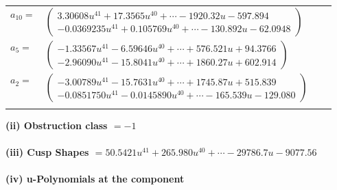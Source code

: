 \documentclass[1p]{elsarticle_modified}
\theoremstyle{definition}
\begin{document}
\begin{tabular}{m{7pt} m{180pt} m{7pt} m{180pt} }
\flushright $a_{10}=$&$\begin{pmatrix}3.30608 u^{41}+17.3565 u^{40}+\cdots-1920.32 u-597.894\\-0.0369235 u^{41}+0.105769 u^{40}+\cdots-130.892 u-62.0948\end{pmatrix}$ \\
\flushright $a_{5}=$&$\begin{pmatrix}-1.33567 u^{41}-6.59646 u^{40}+\cdots+576.521 u+94.3766\\-2.96090 u^{41}-15.8041 u^{40}+\cdots+1860.27 u+602.914\end{pmatrix}$ \\
\flushright $a_{2}=$&$\begin{pmatrix}-3.00789 u^{41}-15.7631 u^{40}+\cdots+1745.87 u+515.839\\-0.0851750 u^{41}-0.0145890 u^{40}+\cdots-165.539 u-129.080\end{pmatrix}$\\&\end{tabular}
\flushleft \textbf{(ii) Obstruction class $= -1$}\\~\\
\flushleft \textbf{(iii) Cusp Shapes $= 50.5421 u^{41}+265.980 u^{40}+\cdots-29786.7 u-9077.56$}\\~\\
\newpage\renewcommand{\arraystretch}{1}
\flushleft \textbf{(iv) u-Polynomials at the component}\newline \\
\end{document}
